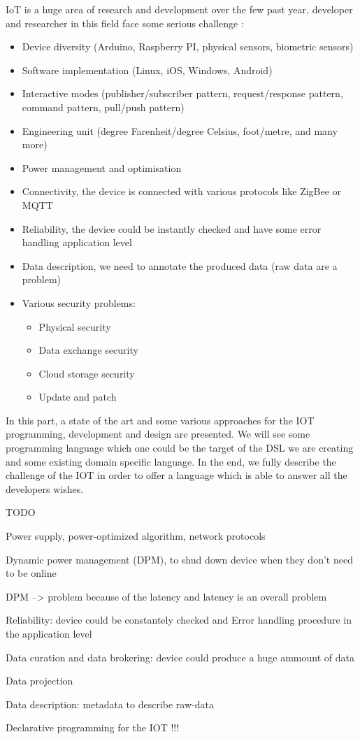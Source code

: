 \label{cha:iot_challenge}

IoT is a huge area of research and development over the few past year,
developer and researcher in this field face some serious challenge
\cite{DBLP:conf/mipro/2015}\cite{Gubbi20131645}\cite{bendickson2016}:

\begin{itemize}
\item Device diversity (Arduino, Raspberry PI, physical sensors, biometric
sensors)
\item Software implementation (Linux, iOS, Windows, Android)
\item Interactive modes (publisher/subscriber pattern, request/response
pattern, command pattern, pull/push pattern)
\item Engineering unit (degree Farenheit/degree Celsius, foot/metre, and
many more)
\item Power management and optimisation
\item Connectivity, the device is connected with various protocols like ZigBee
or MQTT
\item Reliability, the device could be instantly checked and have some error
handling application level
\item Data description, we need to annotate the produced data (raw data are a problem)
\item Various security problems:
  \begin{itemize}
  \item Physical security
  \item Data exchange security
  \item Cloud storage security
  \item Update and patch
  \end{itemize}
\end{itemize}

In this part, a state of the art and some various approaches for the
IOT programming, development and design are presented. We will see some
programming language which one could be the target of the DSL we are creating
and some existing domain specific language. In the end, we fully describe the
challenge of the IOT in order to offer a language which is able to answer all
the developers wishes.

TODO

Power supply, power-optimized algorithm, network protocols

Dynamic power management (DPM), to shud down device when they don’t need to be
online

DPM --> problem because of the latency and latency is an overall problem

Reliability: device could be constantely checked and Error handling procedure
in the application level

Data curation and data brokering: device could produce a huge ammount of data

Data projection

Data description: metadata to describe raw-data

Declarative programming for the IOT !!!

